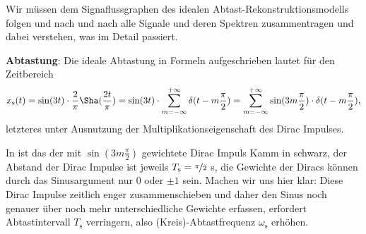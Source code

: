 \begin{ExCalc}
Wir müssen dem Signaflussgraphen des idealen Abtast-Rekonstruktionsmodells
folgen und nach und nach alle Signale und deren Spektren zusammentragen und dabei
verstehen, was im Detail passiert.

\textbf{Abtastung}:
Die ideale Abtastung in Formeln aufgeschrieben lautet für den Zeitbereich
\begin{equation}
x_\mathrm{s}(t) = \sin(3 t) \cdot \frac{2}{\pi} {\Sha}(\frac{2 t}{\pi}) =
\sin(3 t) \cdot \sum_{m=-\infty}^{+\infty} \delta(t-m \frac{\pi}{2})=
\sum_{m=-\infty}^{+\infty} \sin(3 m \frac{\pi}{2}) \cdot \delta(t-m \frac{\pi}{2}),
\end{equation}
letzteres unter Ausnutzung der Multiplikationseigenschaft des Dirac Impulses.

In  ist das der mit $\sin(3 m \frac{\pi}{2})$
gewichtete  Dirac Impuls Kamm in schwarz, der Abstand der Dirac Impulse ist jeweils
$T_\mathrm{s}=\nicefrac{\pi}{2}$ s,
die Gewichte der Diracs können durch das Sinusargument nur $0$ oder $\pm 1$ sein.
Machen wir uns hier klar: Diese Dirac Impulse zeitlich enger zusammenschieben und daher
den Sinus noch genauer über noch mehr unterschiedliche Gewichte erfassen, erfordert
Abtastintervall $T_\mathrm{s}$ verringern, also (Kreis)-Abtastfrequenz $\omega_\mathrm{s}$
erhöhen.


\end{ExCalc}
